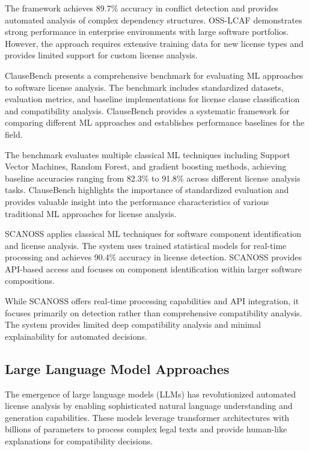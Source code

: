 The framework achieves 89.7\% accuracy in conflict detection and provides automated analysis of complex dependency structures. OSS-LCAF demonstrates strong performance in enterprise environments with large software portfolios. However, the approach requires extensive training data for new license types and provides limited support for custom license analysis.


ClauseBench \cite{KeHZW25} presents a comprehensive benchmark for evaluating ML approaches to software license analysis. The benchmark includes standardized datasets, evaluation metrics, and baseline implementations for license clause classification and compatibility analysis. ClauseBench provides a systematic framework for comparing different ML approaches and establishes performance baselines for the field.

The benchmark evaluates multiple classical ML techniques including Support Vector Machines, Random Forest, and gradient boosting methods, achieving baseline accuracies ranging from 82.3\% to 91.8\% across different license analysis tasks. ClauseBench highlights the importance of standardized evaluation and provides valuable insight into the performance characteristics of various traditional ML approaches for license analysis.



SCANOSS \cite{scanoss_engine2025} applies classical ML techniques for software component identification and license analysis. The system uses trained statistical models for real-time processing and achieves 90.4\% accuracy in license detection. SCANOSS provides API-based access and focuses on component identification within larger software compositions.

While SCANOSS offers real-time processing capabilities and API integration, it focuses primarily on detection rather than comprehensive compatibility analysis. The system provides limited deep compatibility analysis and minimal explainability for automated decisions.

\subsection{Large Language Model Approaches}

The emergence of large language models (LLMs) has revolutionized automated license analysis by enabling sophisticated natural language understanding and generation capabilities. These models leverage transformer architectures with billions of parameters to process complex legal texts and provide human-like explanations for compatibility decisions.

